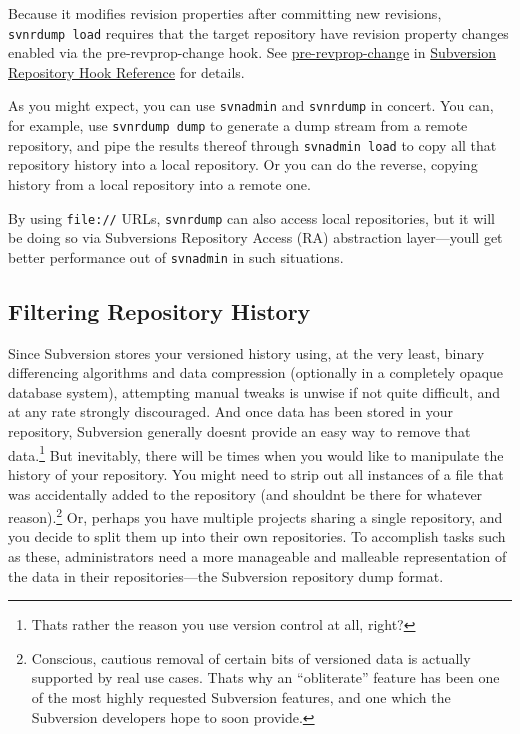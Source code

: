 Because it modifies revision properties after committing new revisions,
\texttt{svnrdump\ load} requires that the target repository have
revision property changes enabled via the pre-revprop-change hook. See
\hyperref[svn.ref.reposhooks.pre-revprop-change]{pre-revprop-change} in
\hyperref[svn.ref.reposhooks]{Subversion Repository Hook Reference} for
details.

As you might expect, you can use \texttt{svnadmin} and \texttt{svnrdump}
in concert. You can, for example, use \texttt{svnrdump\ dump} to
generate a dump stream from a remote repository, and pipe the results
thereof through \texttt{svnadmin\ load} to copy all that repository
history into a local repository. Or you can do the reverse, copying
history from a local repository into a remote one.

By using \texttt{file://} URLs, \texttt{svnrdump} can also access local
repositories, but it will be doing so via Subversion\textquotesingle s
Repository Access (RA) abstraction layer---you\textquotesingle ll get
better performance out of \texttt{svnadmin} in such situations.

\subsection{Filtering Repository
History}\label{svn.reposadmin.maint.filtering}

Since Subversion stores your versioned history using, at the very least,
binary differencing algorithms and data compression (optionally in a
completely opaque database system), attempting manual tweaks is unwise
if not quite difficult, and at any rate strongly discouraged. And once
data has been stored in your repository, Subversion generally
doesn\textquotesingle t provide an easy way to remove that
data.\footnote{That\textquotesingle s rather the reason you use version
  control at all, right?} But inevitably, there will be times when you
would like to manipulate the history of your repository. You might need
to strip out all instances of a file that was accidentally added to the
repository (and shouldn\textquotesingle t be there for whatever
reason).\footnote{Conscious, cautious removal of certain bits of
  versioned data is actually supported by real use cases.
  That\textquotesingle s why an ``obliterate'' feature has been one of
  the most highly requested Subversion features, and one which the
  Subversion developers hope to soon provide.} Or, perhaps you have
multiple projects sharing a single repository, and you decide to split
them up into their own repositories. To accomplish tasks such as these,
administrators need a more manageable and malleable representation of
the data in their repositories---the Subversion repository dump format.

